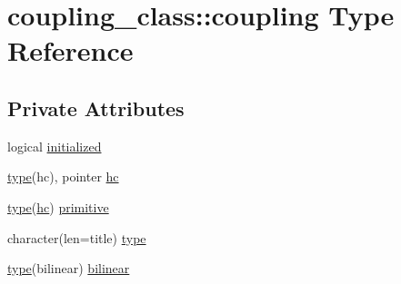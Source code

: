 \hypertarget{structcoupling__class_1_1coupling}{\section{coupling\-\_\-class\-:\-:coupling Type Reference}
\label{structcoupling__class_1_1coupling}
}
\subsection*{Private Attributes}
\begin{DoxyCompactItemize}
\item 
logical \hyperlink{structcoupling__class_1_1coupling_affedc100d4678792285e848dd4deb313}{initialized}
\item 
\hyperlink{structcoupling__class_1_1coupling_a74b13fd447f07c24380e3913fd06d545}{type}(hc), pointer \hyperlink{structcoupling__class_1_1coupling_a2592edb5bbaf558a6196d78782c17ac2}{hc}
\item 
\hyperlink{structcoupling__class_1_1coupling_a74b13fd447f07c24380e3913fd06d545}{type}(\hyperlink{structcoupling__class_1_1coupling_a2592edb5bbaf558a6196d78782c17ac2}{hc}) \hyperlink{structcoupling__class_1_1coupling_a330aec84b5697ea890627c9a10562fb5}{primitive}
\item 
character(len=title) \hyperlink{structcoupling__class_1_1coupling_a74b13fd447f07c24380e3913fd06d545}{type}
\item 
\hyperlink{structcoupling__class_1_1coupling_a74b13fd447f07c24380e3913fd06d545}{type}(bilinear) \hyperlink{structcoupling__class_1_1coupling_a64232ba94787370a17c636014e966d13}{bilinear}
\end{DoxyCompactItemize}


